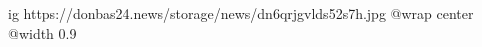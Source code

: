  
 
 
 
 

\ifcmt
  ig https://donbas24.news/storage/news/dn6qrjgvlds52s7h.jpg
  @wrap center
  @width 0.9
\fi
